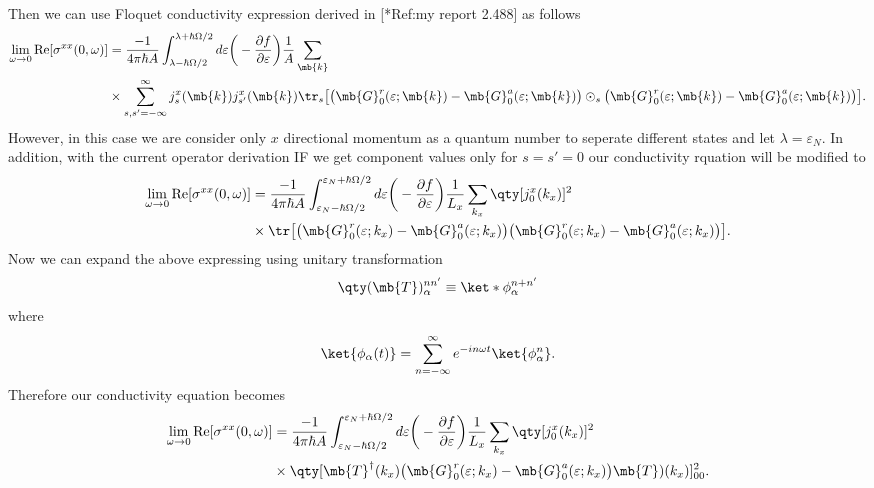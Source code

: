 \noindent
Then we can use Floquet conductivity expression derived in [*Ref:my report 2.488] as follows
\begin{equation} \label{6.9}
  \begin{aligned}
    \lim_{\omega \to 0}
    \text{Re}[{\sigma}^{xx}(0,\omega)] &=
    \frac{-1}{4\pi\hbar A}
    \int_{\lambda-\hbar\Omega/2}^{\lambda+ \hbar\Omega/2} d\varepsilon
    \bigg(
    -\frac{\partial f}{\partial \varepsilon} \bigg)
    \frac{1}{A}\sum_{\mb{k}} \\
    & \times
    \sum_{s,s'=-\infty}^{\infty}
    {j}^x_s(\mb{k}){j}^x_{s'}(\mb{k})
    \tr_s \big[
    \big(
    \mb{G}^{r}_0 (\varepsilon;\mb{k}) - \mb{G}^{a}_0 (\varepsilon;\mb{k})
    \big)
    \odot_s
    \big(
    \mb{G}^{r}_0 (\varepsilon;\mb{k}) - \mb{G}^{a}_0 (\varepsilon;\mb{k})
    \big)
    \big].
  \end{aligned}
\end{equation}
However, in this case we are consider only $x$ directional momentum as a quantum number to seperate different states and let $\lambda = \varepsilon_N$. In addition, with the current operator derivation IF we get component values only for $s=s'=0$ our conductivity rquation will be modified to
\begin{equation} \label{6.10}
  \begin{aligned}
    \lim_{\omega \to 0}
    \text{Re}[{\sigma}^{xx}(0,\omega)] &=
    \frac{-1}{4\pi\hbar A}
    \int_{\varepsilon_N - \hbar\Omega/2}^{\varepsilon_N + \hbar\Omega/2} d\varepsilon
    \bigg(
    -\frac{\partial f}{\partial \varepsilon} \bigg)
    \frac{1}{L_x}\sum_{{k_x}}
    \qty[{j}^x_0({k_x})]^2
    \\
    & \times
    \tr \big[
    \big(
    \mb{G}^{r}_0 (\varepsilon;{k_x}) - \mb{G}^{a}_0 (\varepsilon;{k_x})
    \big)
    \big(
    \mb{G}^{r}_0 (\varepsilon;{k_x}) - \mb{G}^{a}_0 (\varepsilon;{k_x})
    \big)
    \big].
  \end{aligned}
\end{equation}
Now we can expand the above expressing using unitary transformation
\begin{equation} \label{6.11}
    \qty(\mb{T})_{\alpha}^{nn'} \equiv \ket*{\phi_{\alpha}^{n+n'}}
\end{equation}
where
\begin{equation} \label{6.12}
    \ket{\phi_{\alpha}(t)} = \sum_{n = - \infty}^{\infty} e^{-in\omega t}
    \ket{\phi_{\alpha}^{n}}.
\end{equation}
Therefore our conductivity equation becomes
\begin{equation} \label{6.13}
  \begin{aligned}
    \lim_{\omega \to 0}
    \text{Re}[{\sigma}^{xx}(0,\omega)] &=
    \frac{-1}{4\pi\hbar A}
    \int_{\varepsilon_N - \hbar\Omega/2}^{\varepsilon_N + \hbar\Omega/2} d\varepsilon
    \bigg(
    -\frac{\partial f}{\partial \varepsilon} \bigg)
    \frac{1}{L_x}\sum_{{k_x}}
    \qty[{j}^x_0({k_x})]^2
    \\
    & \times
    \qty[
    \mb{T}^{\dagger}(k_x)
    \big(
    \mb{G}^{r}_0 (\varepsilon;{k_x}) - \mb{G}^{a}_0 (\varepsilon;{k_x})
    \big)
    \mb{T})(k_x)
    ]^2_{00}.
  \end{aligned}
\end{equation}
